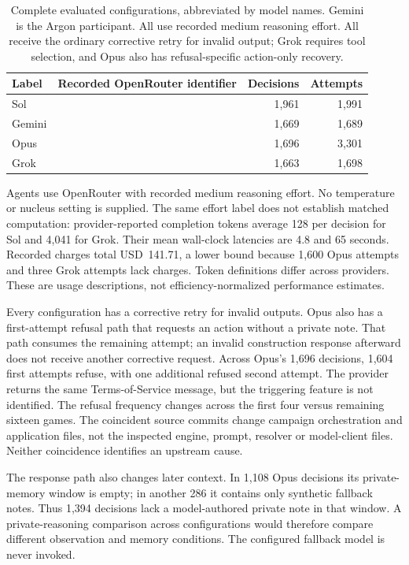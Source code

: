\begin{table}[t]
\centering\small
\begin{tabularx}{\linewidth}{@{}lYrr@{}}
\toprule
Label & Recorded OpenRouter identifier & Decisions & Attempts\\
\midrule
Sol &  & 1,961 & 1,991\\
Gemini &  & 1,669 & 1,689\\
Opus &  & 1,696 & 3,301\\
Grok &  & 1,663 & 1,698\\
\bottomrule
\end{tabularx}
\caption{Complete evaluated configurations, abbreviated by model names. Gemini is the Argon participant. All use recorded medium reasoning effort. All receive the ordinary corrective retry for invalid output; Grok requires tool selection, and Opus also has refusal-specific action-only recovery.}
\label{tab:config}
\end{table}

Agents use OpenRouter with recorded medium reasoning effort. No temperature or nucleus setting is supplied. The same effort label does not establish matched computation: provider-reported completion tokens average 128 per decision for Sol and 4,041 for Grok. Their mean wall-clock latencies are 4.8 and 65 seconds. Recorded charges total USD~141.71, a lower bound because 1,600 Opus attempts and three Grok attempts lack charges. Token definitions differ across providers. These are usage descriptions, not efficiency-normalized performance estimates.

Every configuration has a corrective retry for invalid outputs. Opus also has a first-attempt refusal path that requests an action without a private note. That path consumes the remaining attempt; an invalid construction response afterward does not receive another corrective request. Across Opus's 1,696 decisions, 1,604 first attempts refuse, with one additional refused second attempt. The provider returns the same Terms-of-Service message, but the triggering feature is not identified. The refusal frequency changes across the first four versus remaining sixteen games. The coincident source commits change campaign orchestration and application files, not the inspected engine, prompt, resolver or model-client files. Neither coincidence identifies an upstream cause.

The response path also changes later context. In 1,108 Opus decisions its private-memory window is empty; in another 286 it contains only synthetic fallback notes. Thus 1,394 decisions lack a model-authored private note in that window. A private-reasoning comparison across configurations would therefore compare different observation and memory conditions. The configured fallback model is never invoked.

